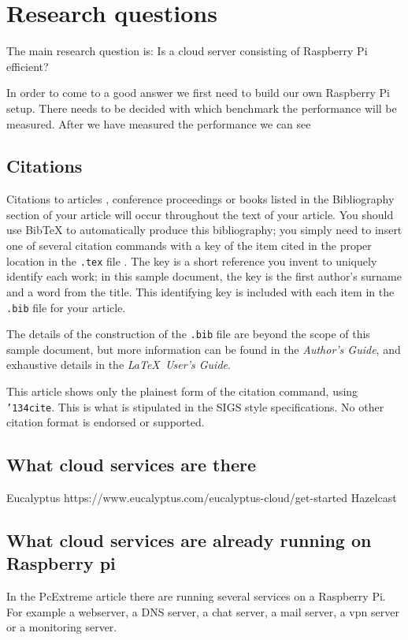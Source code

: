\documentclass{sig-alternate-br}
\begin{document}
\section{Research questions}
The main research question
is: Is a cloud server consisting of Raspberry Pi efficient?

In order to come to a good answer we first need to build our own Raspberry Pi setup. There needs to be decided with which benchmark the performance will be measured. After we have measured the performance we can see   

\subsection{Citations}
Citations to articles \cite{bowman:reasoning, clark:pct,
braams:babel, herlihy:methodology}, conference proceedings
\cite{clark:pct} or books \cite{salas:calculus, Lamport:LaTeX}
listed in the Bibliography section of your article will occur
throughout the text of your article. You should use BibTeX to
automatically produce this bibliography; you simply need to insert
one of several citation commands with a key of the item cited in
the proper location in the \texttt{.tex} file
\cite{Lamport:LaTeX}. The key is a short reference you invent to
uniquely identify each work; in this sample document, the key is
the first author's surname and a word from the title.  This
identifying key is included with each item in the \texttt{.bib}
file for your article.

The details of the construction of the \texttt{.bib} file are
beyond the scope of this sample document, but more information can
be found in the \textit{Author's Guide}, and exhaustive details in
the \textit{\LaTeX\ User's Guide}\cite{Lamport:LaTeX}.

This article shows only the plainest form of the citation command,
using \texttt{{\char'134}cite}. This is what is stipulated in the
SIGS style specifications. No other citation format is endorsed or
supported.
\subsection{What cloud services are there}
Eucalyptus https://www.eucalyptus.com/eucalyptus-cloud/get-started
Hazelcast

\subsection{What cloud services are already running on Raspberry pi}
In the PcExtreme article \cite{Pcextreme} there are running several services on a Raspberry Pi.
For example a webserver, a DNS server, a chat server, a mail server, a vpn server or a monitoring server. 
\end{document}
